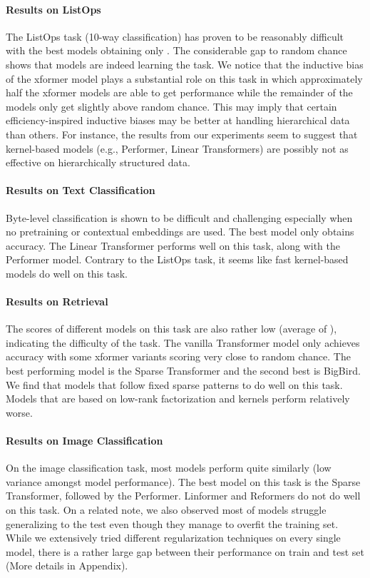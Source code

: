 \documentclass{article} \usepackage{iclr2021_conference,times}
\begin{document}
\paragraph{Results on ListOps} The ListOps task (10-way classification) has proven to be reasonably difficult with the best models obtaining only . The considerable gap to random chance shows that models are indeed learning the task. We notice that the inductive bias of the xformer model plays a substantial role on this task in which approximately half the xformer models are able to get  performance while the remainder of the models only get slightly above random chance. This may imply that certain efficiency-inspired inductive biases may be better at handling hierarchical data than others. For instance, the results from our experiments seem to suggest that kernel-based models (e.g., Performer, Linear Transformers) are possibly not as effective on hierarchically structured data. 
\paragraph{Results on Text Classification} Byte-level classification is shown to be difficult and challenging especially when no pretraining or contextual embeddings are used. The best model only obtains  accuracy. The Linear Transformer performs well on this task, along with the Performer model. Contrary to the ListOps task, it seems like fast kernel-based models do well on this task.
\paragraph{Results on Retrieval} The scores of different models on this task are also rather low (average of ), indicating the difficulty of the task. The vanilla Transformer model only achieves  accuracy with some xformer variants scoring very close to random chance. The best performing model is the Sparse Transformer and the second best is BigBird. We find that models that follow fixed sparse patterns to do well on this task. Models that are based on low-rank factorization and kernels perform relatively worse.

\paragraph{Results on Image Classification} On the image classification task, most models perform quite similarly (low variance amongst model performance). The best model on this task is the Sparse Transformer, followed by the Performer. Linformer and Reformers do not do well on this task. On a related note, we also observed most of models struggle generalizing to the test even though they manage to overfit the training set. While we extensively tried different regularization techniques on every single model, there is a rather large gap between their performance on train and test set (More details in Appendix). 
\end{document}
